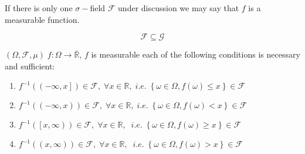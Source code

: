 If there is only one $\sigma-$field $\mathcal{F}$ under discussion we may say that $ f $ is a measurable function.

{\color{red} 
	\begin{remark}
		\begin{equation}
		\mathcal{F} \subseteq \mathcal{G}
		\end{equation}
	\end{remark}

}

\begin{lemma}
	$\left( {\Omega ,\mathcal{F},\mu } \right)\;f:\Omega  \to \overline {\mathbb{R}} $, $ f $ is measurable each of the following conditions is necessary and sufficient:
	\begin{enumerate}
		\item ${f^{ - 1}}\left( {\left( { - \infty ,x} \right]} \right) \in \mathcal{F},\;\forall x \in \mathbb{R},\; i.e. \; \left\{ {\omega  \in \Omega ,f\left( \omega  \right) \leqslant x} \right\} \in \mathcal{F} $
		\item ${f^{ - 1}}\left( {\left( { - \infty ,x} \right)} \right) \in \mathcal{F},\;\forall x \in \mathbb{R},\; i.e. \; \left\{ {\omega  \in \Omega ,f\left( \omega  \right) < x} \right\} \in \mathcal{F}$
		\item ${f^{ - 1}}\left( \left[ {x,\infty } \right) \right) \in \mathcal{F},\;\forall x \in \mathbb{R},\; \;  i.e. \; \left\{ {\omega  \in \Omega ,f\left( \omega  \right) \ge x} \right\} \in \mathcal{F} $
		\item ${f^{ - 1}}\left( {\left( { x, \infty} \right)} \right) \in \mathcal{F},\;\forall x \in \mathbb{R},\; \; i.e. \; \left\{ {\omega  \in \Omega ,f\left( \omega  \right) > x} \right\} \in \mathcal{F}$
	\end{enumerate}
\label{lma10.1}
\end{lemma}

